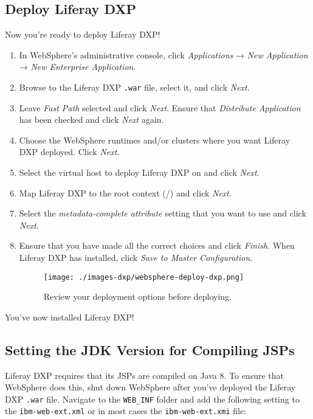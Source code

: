 \subsection{Deploy Liferay DXP}\label{deploy-liferay-dxp-2}

Now you're ready to deploy Liferay DXP!

\begin{enumerate}
\def\labelenumi{\arabic{enumi}.}
\item
  In WebSphere's administrative console, click \emph{Applications} →
  \emph{New Application} → \emph{New Enterprise Application}.
\item
  Browse to the Liferay DXP \texttt{.war} file, select it, and click
  \emph{Next}.
\item
  Leave \emph{Fast Path} selected and click \emph{Next}. Ensure that
  \emph{Distribute Application} has been checked and click \emph{Next}
  again.
\item
  Choose the WebSphere runtimes and/or clusters where you want Liferay
  DXP deployed. Click \emph{Next}.
\item
  Select the virtual host to deploy Liferay DXP on and click
  \emph{Next}.
\item
  Map Liferay DXP to the root context (/) and click \emph{Next}.
\item
  Select the \emph{metadata-complete attribute} setting that you want to
  use and click \emph{Next}.
\item
  Ensure that you have made all the correct choices and click
  \emph{Finish}. When Liferay DXP has installed, click \emph{Save to
  Master Configuration}.

  \begin{figure}
  \centering
  \texttt{[image: ./images-dxp/websphere-deploy-dxp.png]}
  \caption{Review your deployment options before deploying.}
  \end{figure}
\end{enumerate}

You've now installed Liferay DXP!

\subsection{Setting the JDK Version for Compiling
JSPs}\label{setting-the-jdk-version-for-compiling-jsps}

Liferay DXP requires that its JSPs are compiled on Java 8. To ensure
that WebSphere does this, shut down WebSphere after you've deployed the
Liferay DXP \texttt{.war} file. Navigate to the \texttt{WEB\_INF} folder
and add the following setting to the \texttt{ibm-web-ext.xml} or in most
cases the \texttt{ibm-web-ext.xmi} file:

